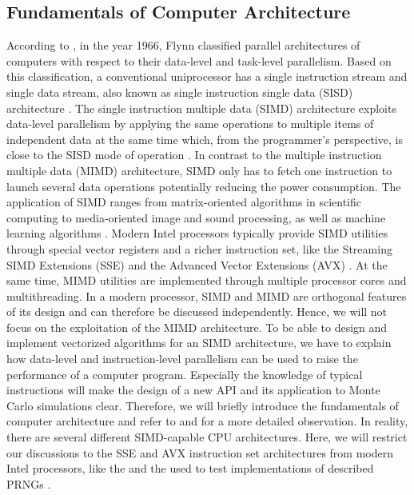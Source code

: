 \documentclass{stdlocal}
\begin{document}
\subsection{Fundamentals of Computer Architecture}
\label{sub:simd-capable_processors}
  According to \textcite[\ppno~10-11]{hennessy2019}, in the year 1966, Flynn classified parallel architectures of computers with respect to their data-level and task-level parallelism.
  Based on this classification, a conventional uniprocessor has a single instruction stream and single data stream, also known as single instruction single data (SISD) architecture \autocite[\ppno~509-510]{patterson2014}.
  The single instruction multiple data (SIMD) architecture exploits data-level parallelism by applying the same operations to multiple items of independent data at the same time \autocite{hennessy2019} which, from the programmer's perspective, is close to the SISD mode of operation \autocite{patterson2014}.
  In contrast to the multiple instruction multiple data (MIMD) architecture, SIMD only has to fetch one instruction to launch several data operations potentially reducing the power consumption.
  The application of SIMD ranges from matrix-oriented algorithms in scientific computing to media-oriented image and sound processing, as well as machine learning algorithms \autocite[\ppno~10-11]{hennessy2019}.
  Modern Intel processors typically provide SIMD utilities through special vector registers and a richer instruction set, like the Streaming SIMD Extensions (SSE) and the Advanced Vector Extensions (AVX) \autocite{intel-intrinsics-guide,fog2019a,fog2019b,fog2019c,fog2019d,fog2019e}.
  At the same time, MIMD utilities are implemented through multiple processor cores and multithreading.
  In a modern processor, SIMD and MIMD are orthogonal features of its design and can therefore be discussed independently.
  Hence, we will not focus on the exploitation of the MIMD architecture.
  To be able to design and implement vectorized algorithms for an SIMD architecture, we have to explain how data-level and instruction-level parallelism can be used to raise the performance of a computer program.
  Especially the knowledge of typical instructions will make the design of a new API and its application to Monte Carlo simulations clear.
  Therefore, we will briefly introduce the fundamentals of computer architecture and refer to \textcite{patterson2014} and \textcite{hennessy2019} for a more detailed observation.
  In reality, there are several different SIMD-capable CPU architectures.
  Here, we will restrict our discussions to the SSE and AVX instruction set architectures from modern Intel processors, like the  and the  used to test implementations of described PRNGs \autocite{intel-kaby-lake-i5,intel-kaby-lake-i7}.
\end{document}
